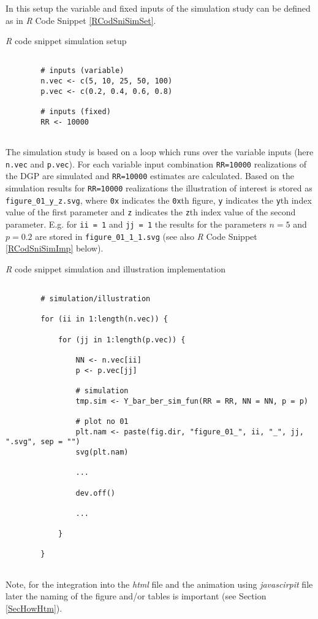 \documentclass[12pt]{article}
\begin{document}
In this setup the variable and fixed inputs of the simulation study can be defined as in \emph{R} Code Snippet \ref{RCodSniSimSet}. 
%
\begin{CodeSnippet}[!hp]
	\centering
	\caption{\emph{R} code snippet simulation setup}
	\normalsize
	\vspace{0.25cm}
	\begin{BVerbatim}
		
		# inputs (variable)
		n.vec <- c(5, 10, 25, 50, 100)
		p.vec <- c(0.2, 0.4, 0.6, 0.8)
		
		# inputs (fixed)
		RR <- 10000
		
	\end{BVerbatim}
	\label{RCodSniSimSet}
\end{CodeSnippet}
%
The simulation study is based on a loop which runs over the variable inputs (here \texttt{n.vec} and \texttt{p.vec}). 
%
For each variable input combination \texttt{RR=10000} realizations of the DGP are simulated and \texttt{RR=10000} estimates are calculated. 
%
Based on the simulation results for \texttt{RR=10000} realizations the illustration of interest is stored as \texttt{figure\_01\_y\_z.svg}, where \texttt{0x} indicates the \texttt{0x}th figure, \texttt{y} indicates the \texttt{y}th index value of the first parameter and \texttt{z} indicates the \texttt{z}th index value of the second parameter. 
%
E.g. for \texttt{ii =  1} and \texttt{jj = 1} the results for the parameters $n=5$ and $p=0.2$ are stored in \texttt{figure\_01\_1\_1.svg} (see also \emph{R} Code Snippet \ref{RCodSniSimImp} below).%
%
\begin{CodeSnippet}[!hp]
	\centering
	\caption{\emph{R} code snippet simulation and illustration implementation}
	\scriptsize
	\vspace{0.25cm}
	\begin{BVerbatim}
		
		# simulation/illustration
		
		for (ii in 1:length(n.vec)) {
			
			for (jj in 1:length(p.vec)) {
				
				NN <- n.vec[ii]
				p <- p.vec[jj]
				
				# simulation
				tmp.sim <- Y_bar_ber_sim_fun(RR = RR, NN = NN, p = p)
								
				# plot no 01
				plt.nam <- paste(fig.dir, "figure_01_", ii, "_", jj, ".svg", sep = "")
				svg(plt.nam) 
				
				...
				
				dev.off()		
				
				...
				
			}
			
		}
		
	\end{BVerbatim}
	\label{RCodSniSimImp}
\end{CodeSnippet}
%
Note, for the integration into the \emph{html} file and the animation using \emph{javascirpit} file later the naming of the figure and/or tables is important (see Section \ref{SecHowHtm}).
\end{document}
